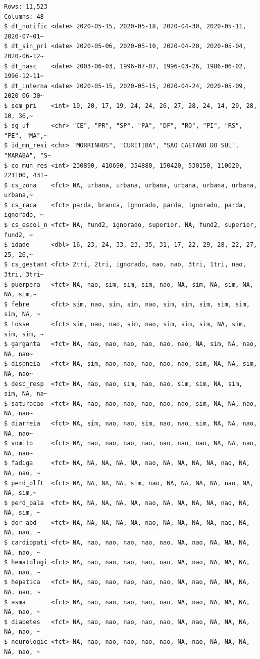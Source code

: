 \documentclass[
  letterpaper,
  DIV=11,
  numbers=noendperiod]{scrreprt}
\begin{document}
\begin{verbatim}
Rows: 11,523
Columns: 48
$ dt_notific <date> 2020-05-15, 2020-05-18, 2020-04-30, 2020-05-11, 2020-07-01~
$ dt_sin_pri <date> 2020-05-06, 2020-05-10, 2020-04-20, 2020-05-04, 2020-06-12~
$ dt_nasc    <date> 2003-06-03, 1996-07-07, 1996-03-26, 1986-06-02, 1996-12-11~
$ dt_interna <date> 2020-05-15, 2020-05-15, 2020-04-24, 2020-05-09, 2020-06-30~
$ sem_pri    <int> 19, 20, 17, 19, 24, 24, 26, 27, 28, 24, 14, 29, 28, 10, 36,~
$ sg_uf      <chr> "CE", "PR", "SP", "PA", "DF", "RO", "PI", "RS", "PE", "MA",~
$ id_mn_resi <chr> "MORRINHOS", "CURITIBA", "SAO CAETANO DO SUL", "MARABA", "S~
$ co_mun_res <int> 230890, 410690, 354880, 150420, 530150, 110020, 221100, 431~
$ cs_zona    <fct> NA, urbana, urbana, urbana, urbana, urbana, urbana, urbana,~
$ cs_raca    <fct> parda, branca, ignorado, parda, ignorado, parda, ignorado, ~
$ cs_escol_n <fct> NA, fund2, ignorado, superior, NA, fund2, superior, fund2, ~
$ idade      <dbl> 16, 23, 24, 33, 23, 35, 31, 17, 22, 29, 28, 22, 27, 25, 26,~
$ cs_gestant <fct> 2tri, 2tri, ignorado, nao, nao, 3tri, 1tri, nao, 3tri, 3tri~
$ puerpera   <fct> NA, nao, sim, sim, sim, nao, NA, sim, NA, sim, NA, NA, sim,~
$ febre      <fct> sim, nao, sim, sim, nao, sim, sim, sim, sim, sim, sim, NA, ~
$ tosse      <fct> sim, nao, nao, sim, nao, sim, sim, sim, NA, sim, sim, sim, ~
$ garganta   <fct> NA, nao, nao, nao, nao, nao, nao, NA, sim, NA, nao, NA, nao~
$ dispneia   <fct> NA, sim, nao, nao, nao, nao, nao, sim, NA, NA, sim, NA, nao~
$ desc_resp  <fct> NA, nao, nao, sim, nao, nao, sim, sim, NA, sim, sim, NA, na~
$ saturacao  <fct> NA, nao, nao, nao, nao, nao, nao, sim, NA, NA, nao, NA, nao~
$ diarreia   <fct> NA, sim, nao, nao, sim, nao, nao, sim, NA, NA, nao, NA, nao~
$ vomito     <fct> NA, nao, nao, nao, nao, nao, nao, nao, NA, NA, nao, NA, nao~
$ fadiga     <fct> NA, NA, NA, NA, NA, nao, NA, NA, NA, NA, nao, NA, NA, nao, ~
$ perd_olft  <fct> NA, NA, NA, NA, sim, nao, NA, NA, NA, NA, nao, NA, NA, sim,~
$ perd_pala  <fct> NA, NA, NA, NA, NA, nao, NA, NA, NA, NA, nao, NA, NA, sim, ~
$ dor_abd    <fct> NA, NA, NA, NA, NA, nao, NA, NA, NA, NA, nao, NA, NA, nao, ~
$ cardiopati <fct> NA, nao, nao, nao, nao, nao, NA, nao, NA, NA, NA, NA, nao, ~
$ hematologi <fct> NA, nao, nao, nao, nao, nao, NA, nao, NA, NA, NA, NA, nao, ~
$ hepatica   <fct> NA, nao, nao, nao, nao, nao, NA, nao, NA, NA, NA, NA, nao, ~
$ asma       <fct> NA, nao, nao, nao, nao, nao, NA, nao, NA, NA, NA, NA, nao, ~
$ diabetes   <fct> NA, nao, nao, nao, nao, nao, NA, nao, NA, NA, NA, NA, nao, ~
$ neurologic <fct> NA, nao, nao, nao, nao, nao, NA, nao, NA, NA, NA, NA, nao, ~

\end{verbatim}
\end{document}
